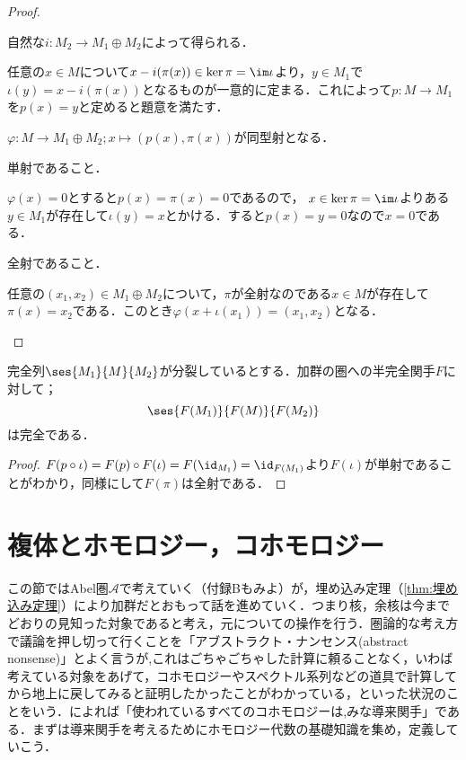 \begin{proof}
	\begin{eqv}[3]
		\item 自然な$i:M_2\to M_1\oplus M_2$によって得られる．
		
		\item 任意の$x\in M$について$x-i(\pi(x))\in\ker\pi=\im\iota$より，$y\in M_1$で$\iota(y)=x-i(\pi(x))$となるものが一意的に定まる．これによって$p:M\to M_1$を$p(x)=y$と定めると題意を満たす．
		
		\item $\varphi:M\to M_1\oplus M_2;x\mapsto(p(x),\pi(x))$が同型射となる．
		\begin{step}
			\item 単射であること．
			
			$\varphi(x)=0$とすると$p(x)=\pi(x)=0$であるので， $x\in\ker\pi=\im\iota$よりある$y\in M_1$が存在して$\iota(y)=x$とかける．すると$p(x)=y=0$なので$x=0$である．
			
			\item 全射であること．
			
			任意の$(x_1,x_2)\in M_1\oplus M_2$について，$\pi$が全射なのである$x\in M$が存在して$\pi(x)=x_2$である．このとき$\varphi(x+\iota(x_1))=(x_1,x_2)$となる．
		\end{step}
		
	\end{eqv}
\end{proof}

\begin{thm}\label{thm:分裂しているなら完全性は保存される}
	完全列$\ses{M_1}{M}{M_2}$が分裂しているとする．加群の圏への半完全関手$F$に対して；
	\[\ses{F(M_1)}{F(M)}{F(M_2)}\]
	は完全である．
\end{thm}

\begin{proof}
	$F(p\circ\iota)=F(p)\circ F(\iota)=F(\id_{M_1})=\id_{F(M_1)}$より$F(\iota)$が単射であることがわかり，同様にして$F(\pi)$は全射である．
\end{proof}
\section{複体とホモロジー，コホモロジー}

この節ではAbel圏$\mathscr{A}$で考えていく（付録Bもみよ）が，埋め込み定理（\ref{thm:埋め込み定理}）により加群だとおもって話を進めていく．つまり核，余核は今までどおりの見知った対象であると考え，元についての操作を行う．圏論的な考え方で議論を押し切って行くことを「アブストラクト・ナンセンス(abstract nonsense)」とよく言うが,これはごちゃごちゃした計算に頼ることなく，いわば考えている対象をあげて，コホモロジーやスペクトル系列などの道具で計算してから地上に戻してみると証明したかったことがわかっている，といった状況のことをいう．\cite{kato}によれば「使われているすべてのコホモロジーは,みな導来関手」である．まずは導来関手を考えるためにホモロジー代数の基礎知識を集め，定義していこう．
	
